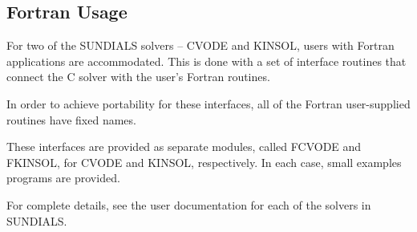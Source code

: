 \subsection{Fortran Usage}

For two of the SUNDIALS solvers -- CVODE and KINSOL, users with
Fortran applications are accommodated.  This is done with a set of
interface routines that connect the C solver with the user's Fortran
routines.

In order to achieve portability for these interfaces, all of the
Fortran user-supplied routines have fixed names.

These interfaces are provided as separate modules, called FCVODE and
FKINSOL, for CVODE and KINSOL, respectively.  In each case, small
examples programs are provided.

For complete details,
see the user documentation for each of the solvers in SUNDIALS.





